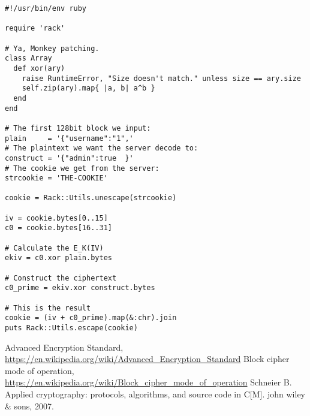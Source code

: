 \documentclass[a4paper,UTF8]{ctexart}
\begin{document}
\begin{verbatim}
#!/usr/bin/env ruby

require 'rack'

# Ya, Monkey patching.
class Array
  def xor(ary)
    raise RuntimeError, "Size doesn't match." unless size == ary.size
    self.zip(ary).map{ |a, b| a^b }
  end
end

# The first 128bit block we input:
plain     = '{"username":"1",'
# The plaintext we want the server decode to:
construct = '{"admin":true  }'
# The cookie we get from the server:
strcookie = 'THE-COOKIE'

cookie = Rack::Utils.unescape(strcookie)

iv = cookie.bytes[0..15]
c0 = cookie.bytes[16..31]

# Calculate the E_K(IV)
ekiv = c0.xor plain.bytes

# Construct the ciphertext
c0_prime = ekiv.xor construct.bytes

# This is the result
cookie = (iv + c0_prime).map(&:chr).join
puts Rack::Utils.escape(cookie)

\end{verbatim}



\begin{thebibliography}{99}
\setlength{\parskip}{0pt}  %

 Advanced Encryption Standard, \url{https://en.wikipedia.org/wiki/Advanced_Encryption_Standard}
 Block cipher mode of operation, \url{https://en.wikipedia.org/wiki/Block_cipher_mode_of_operation}
 Schneier B. Applied cryptography: protocols, algorithms, and source code in C[M]. john wiley \& sons, 2007.
\end{thebibliography}


\end{document}
